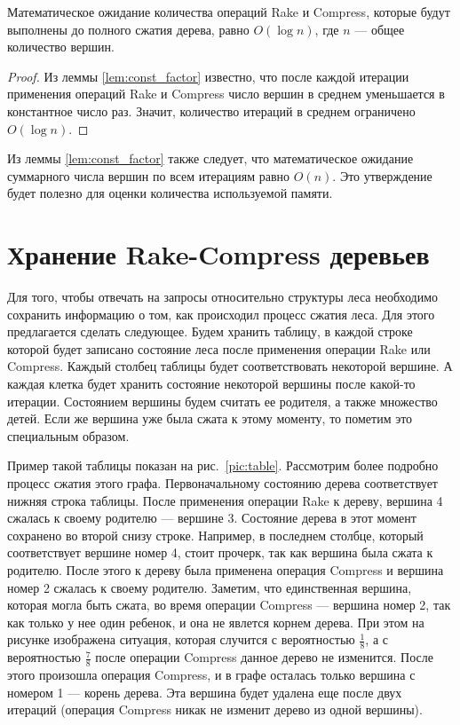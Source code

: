 \begin{theorem}
\label{the:log}
 Математическое ожидание количества операций Rake и Compress, которые будут выполнены до полного сжатия дерева, равно $O(\log n)$, где $n$ --- общее количество вершин. 
\begin{proof}
Из леммы \ref{lem:const_factor} известно, что после каждой итерации применения операций Rake и Compress число вершин в среднем уменьшается в константное число раз. Значит, количество итераций в среднем ограничено $O(\log n)$.
\end{proof}
\end{theorem}

Из леммы \ref{lem:const_factor} также следует, что математическое ожидание суммарного числа вершин по всем итерациям равно $O(n)$. Это утверждение будет полезно для оценки количества используемой памяти.

\FloatBarrier
\section{Хранение Rake-Compress деревьев}
\label{sec:tree_storage}

Для того, чтобы отвечать на запросы относительно структуры леса необходимо сохранить информацию о том, как происходил процесс сжатия леса. 
Для этого предлагается сделать следующее. Будем хранить таблицу, в каждой строке которой будет записано состояние леса после применения операции Rake или Compress.
Каждый столбец таблицы будет соответствовать некоторой вершине. 
А каждая клетка будет хранить состояние некоторой вершины после какой-то итерации. Состоянием вершины будем считать ее родителя, а также множество детей. 
Если же вершина уже была сжата к этому моменту, то пометим это специальным образом. 

Пример такой таблицы показан на рис.~\ref{pic:table}. Рассмотрим более подробно процесс сжатия этого графа. 
Первоначальному состоянию дерева соответствует нижняя строка таблицы. После применения операции Rake к дереву, вершина 4 сжалась к своему родителю --- вершине 3.
Состояние дерева в этот момент сохранено во второй снизу строке. Например, в последнем столбце, который соответствует вершине номер 4, стоит прочерк, так как вершина была сжата к родителю.
После этого к дереву была применена операция Compress и вершина номер 2 сжалась к своему родителю. 
Заметим, что единственная вершина, которая могла быть сжата, во время операции Compress --- вершина номер 2, так как только у нее один ребенок, и она не явлется корнем дерева.
При этом на рисунке изображена ситуация, которая случится с вероятностью $\frac{1}{8}$, а с вероятностью $\frac{7}{8}$ после операции Compress данное дерево не изменится.
После этого произошла операция Compress, и в графе осталась только вершина с номером 1 --- корень дерева. 
Эта вершина будет удалена еще после двух итераций (операция Compress никак не изменит дерево из одной вершины).

